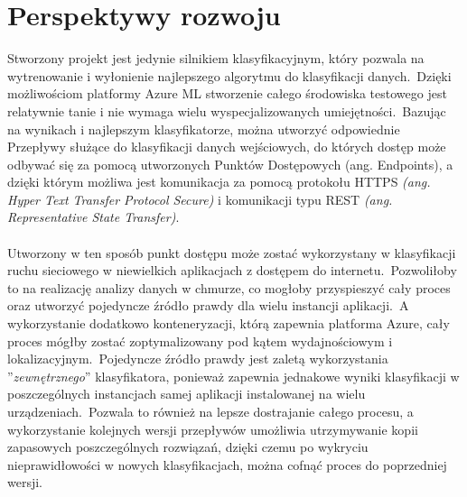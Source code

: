 \chapter{Perspektywy rozwoju}
Stworzony projekt jest jedynie silnikiem klasyfikacyjnym, który pozwala na wytrenowanie i wyłonienie najlepszego algorytmu do klasyfikacji danych.\ Dzięki możliwościom platformy Azure ML stworzenie całego środowiska testowego jest relatywnie tanie i nie wymaga wielu wyspecjalizowanych umiejętności.\ Bazując na wynikach i najlepszym klasyfikatorze, można utworzyć odpowiednie Przepływy służące do klasyfikacji danych wejściowych, do których dostęp może odbywać się za pomocą utworzonych Punktów Dostępowych \trans(ang. Endpoints), a dzięki którym możliwa jest komunikacja za pomocą protokołu HTTPS \textit{(ang. Hyper Text Transfer Protocol Secure)} i komunikacji typu REST \textit{(ang. Representative State Transfer)}.
\\ \\
Utworzony w ten sposób punkt dostępu może zostać wykorzystany w klasyfikacji ruchu sieciowego w niewielkich aplikacjach z dostępem do internetu.\ Pozwoliłoby to na realizację analizy danych w chmurze, co mogłoby przyspieszyć cały proces oraz utworzyć pojedyncze źródło prawdy dla wielu instancji aplikacji.\ A wykorzystanie dodatkowo konteneryzacji, którą zapewnia platforma Azure, cały proces mógłby zostać zoptymalizowany pod kątem wydajnościowym i lokalizacyjnym.\ Pojedyncze źródło prawdy jest zaletą wykorzystania ''\textit{zewnętrznego}'' klasyfikatora, ponieważ zapewnia jednakowe wyniki klasyfikacji w poszczególnych instancjach samej aplikacji instalowanej na wielu urządzeniach.\ Pozwala to również na lepsze dostrajanie całego procesu, a wykorzystanie kolejnych wersji przepływów umożliwia utrzymywanie kopii zapasowych poszczególnych rozwiązań, dzięki czemu po wykryciu nieprawidłowości w nowych klasyfikacjach, można cofnąć proces do poprzedniej wersji.
